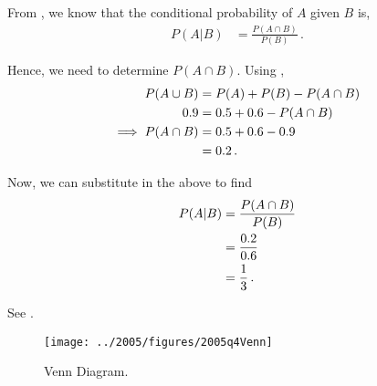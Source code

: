 \begin{subquestions}
\subquestion

\begin{subsubquestions}
	
\subsubquestion
From , we know that the conditional probability of $A$ given $B$ is,
\begin{align}
	P(A|B) & = \frac{P(A\cap B)}{P(B)} \,.
\end{align}

Hence, we need to determine $P(A \cap B)$. Using ,
\begin{align}
	P(A \cup B) & = P(A) + P(B) - P(A \cap B) \nonumber \\
	        0.9 & = 0.5+0.6-P(A \cap B) \nonumber \\
	        \implies P(A \cap B) & = 0.5+0.6-0.9 \nonumber \\
	                             & = 0.2 \,.
\end{align}
	
Now, we can substitute in the above to find
\begin{align}
	P(A|B) & = \frac{P(A\cap B)}{P(B)} \nonumber \\
	       & = \frac{0.2}{0.6} \nonumber \\
	       & = \frac{1}{3} \,.
\end{align}


\subsubquestion

See .

\begin{figure} [H]
	\begin{center}
		\texttt{[image: ../2005/figures/2005q4Venn]}
		\caption{\label{2005:q4:fig:Venn} Venn Diagram.}
	\end{center}
\end{figure}

\end{subsubquestions}

\end{subquestions}